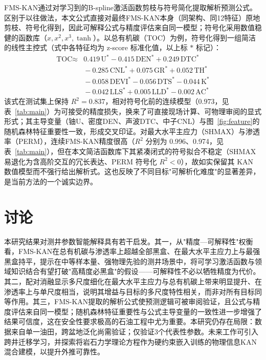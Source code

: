 \documentclass[final,3p,times,twocolumn]{elsarticle}
\begin{document}
FMS-KAN通过对学习到的B-spline激活函数剪枝与符号简化提取解析预测公式。区别于以往做法，本文公式直接对最终FMS-KAN本身（同架构、同12特征）原地剪枝、符号化得到，因此可解释公式与精度评估来自同一模型；符号化采用数值稳健的函数库（$x,x^2,x^3,\tanh$）。以总有机碳（TOC）为例，符号化得到一组简洁的线性主控式（式中各特征均为 z-score 标准化值，以上标 $*$ 标记）：
\begin{equation}
\begin{aligned}
  \text{TOC} \approx{}& 0.419\,\text{U}^{*} - 0.415\,\text{DEN}^{*} + 0.249\,\text{DTC}^{*} \\
  &{} - 0.285\,\text{CNL}^{*} + 0.075\,\text{GR}^{*} + 0.052\,\text{TH}^{*} \\
  &{} - 0.058\,\text{DEVI}^{*} - 0.056\,\text{DTS}^{*} - 0.044\,\text{K}^{*} \\
  &{} - 0.042\,\text{LLS}^{*} + 0.005\,\text{LLD}^{*} - 0.002\,\text{AC}^{*}
\end{aligned}
\end{equation}
该式在测试集上保持 $R^2=0.837$，相对符号化前的连续模型（$0.973$，见表~\ref{tab:main}）为可接受的精度损失，换来了可直接现场计算、可物理审阅的显式形式；其主导变量（铀U、密度DEN、声波DTC、中子CNL）与图~\ref{fig:feature}的随机森林特征重要性一致，形成交叉印证。对最大水平主应力（SHMAX）与渗透率（PERM），连续FMS-KAN精度很高（$R^2$ 分别为 0.996、0.974，见表~\ref{tab:main}），但在本文简洁函数库下其紧凑闭式的符号拟合不稳定（SHMAX 易退化为含高阶交互的冗长表达、PERM 符号化 $R^2<0$），故如实保留其 KAN 数值模型而不强行给出解析式。这也反映了不同目标"可解析化难度"的显著差异，是当前方法的一个诚实边界。

\section{讨论}

本研究结果对测井参数智能解释具有若干启发。其一，从"精度—可解释性"权衡看，FMS-KAN在总有机碳与渗透率上超越全部黑盒、在最大水平主应力上与最强黑盒持平，提示在中等样本量、强物理先验的测井场景中，将可学习激活函数与领域知识结合有望打破"高精度必黑盒"的假设——可解释性不必以牺牲精度为代价。其二，配对消融显示多尺度细化在最大水平主应力与总有机碳上带来明显提升、在渗透率上与单尺度相当，说明其增益与目标的多尺度特性相关，而非对所有目标同等作用。其三，FMS-KAN提取的解析公式使预测逻辑可被审阅验证，且公式与精度评估来自同一模型；随机森林特征重要性与公式主导变量的一致性进一步增强了结果可信度，这在安全性要求极高的石油工程中尤为重要。本研究仍存在局限：数据来自单一油田，跨盆地泛化尚需验证；仅验证3个代表性参数。未来工作可引入跨井迁移学习，并探索将岩石力学理论方程作为硬约束嵌入训练的物理信息KAN混合建模，以提升外推可靠性。
\end{document}
